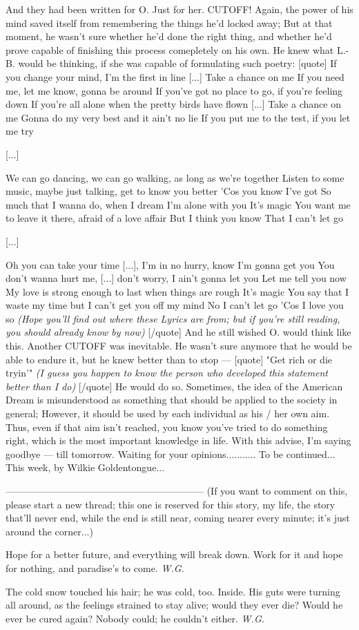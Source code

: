 And they had been written for O. 
Just for her. 
CUTOFF!
Again, the power of his mind saved itself from remembering the things he'd locked away; But at that moment, he wasn't sure whether he'd done the right thing, and whether he'd prove capable of finishing this process comepletely on his own. 
He knew what L.-B. would be thinking, if she was capable of formulating such poetry:
[quote]
If you change your mind, I'm the first in line 
[...]
Take a chance on me 
If you need me, let me know, gonna be around 
If you've got no place to go, if you're feeling down 
If you're all alone when the pretty birds have flown 
[...]
Take a chance on me 
Gonna do my very best and it ain't no lie 
If you put me to the test, if you let me try 
 
[...]
 
We can go dancing, we can go walking, as long as we're together 
Listen to some music, maybe just talking, get to know you better 
'Cos you know I've got 
So much that I wanna do, when I dream I'm alone with you 
It's magic 
You want me to leave it there, afraid of a love affair 
But I think you know 
That I can't let go 
 
[...]
 
Oh you can take your time [...], I'm in no hurry, know I'm gonna get you 
You don't wanna hurt me, [...] don't worry, I ain't gonna let you 
Let me tell you now 
My love is strong enough to last when things are rough 
It's magic 
You say that I waste my time but I can't get you off my mind 
No I can't let go 
'Cos I love you so 
\emph{(Hope you'll find out where these Lyrics are from; but if you're still reading, you should already know by now)}
[/quote]
And he still wished O. would think like this. 
Another CUTOFF was inevitable. 
He wasn't sure anymore that he would be able to endure it, but he knew better than to stop --- 
[quote]
"Get rich or die tryin'"
\emph{(I guess you happen to know the person who developed this statement better than I do)}
[/quote]
He would do so. 
Sometimes, the idea of the American Dream is misunderstood as something that should be applied to the society in general; However, it should be used by each individual as his / her own aim. 
Thus, even if that aim isn't reached, you know you've tried to do something right, which is the most important knowledge in life. 
With this advise, I'm saying goodbye --- till tomorrow. 
Waiting for your opinions...........
To be continued...
This week, by Wilkie Goldentongue...

--------------------------------------------------------------
(If you want to comment on this, please start a new thread; this one is reserved for this story, my life, the story that'll never end, while the end is still near, coming nearer every minute; it's just around the corner...)

Hope for a better future, 
and everything will break down. 
Work for it and hope for nothing, 
and paradise's to come. 
\emph{W.G.}

The cold snow touched his hair;
he was cold, too. 
Inside. 
His guts were turning all around,
as the feelings strained to stay alive;
would they ever die?
Would he ever be cured again?
Nobody could;
he couldn't either. 
\emph{W.G.}
